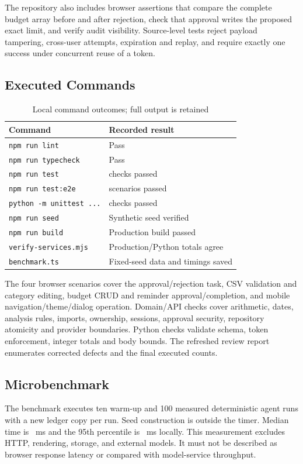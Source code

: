 \documentclass[conference,a4paper]{IEEEtran}
\begin{document}
The repository also includes browser assertions that compare the complete budget array before and after rejection, check that approval writes the proposed exact limit, and verify audit visibility. Source-level tests reject payload tampering, cross-user attempts, expiration and replay, and require exactly one success under concurrent reuse of a token.

\subsection{Executed Commands}
\begin{table}[t]
\caption{Local command outcomes; full output is retained}
\centering\small
\begin{tabular}{L{43mm}L{35mm}}
\toprule Command & Recorded result\\\midrule
\texttt{npm run lint} & Pass\\
\texttt{npm run typecheck} & Pass\\
\texttt{npm run test} & \UnitTests{} checks passed\\
\texttt{npm run test:e2e} & \BrowserTests{} scenarios passed\\
\texttt{python -m unittest ...} & \PythonTests{} checks passed\\
\texttt{npm run seed} & Synthetic seed verified\\
\texttt{npm run build} & Production build passed\\
\texttt{verify-services.mjs} & Production/Python totals agree\\
\texttt{benchmark.ts} & Fixed-seed data and timings saved\\
\bottomrule
\end{tabular}
\end{table}

The four browser scenarios cover the approval/rejection task, CSV validation and category editing, budget CRUD and reminder approval/completion, and mobile navigation/theme/dialog operation. Domain/API checks cover arithmetic, dates, analysis rules, imports, ownership, sessions, approval security, repository atomicity and provider boundaries. Python checks validate schema, token enforcement, integer totals and body bounds. The refreshed review report enumerates corrected defects and the final executed counts.

\subsection{Microbenchmark}
The benchmark executes ten warm-up and 100 measured deterministic agent runs with a new ledger copy per run. Seed construction is outside the timer. Median time is \AgentMedian{}~ms and the 95th percentile is \AgentPninetyfive{}~ms locally. This measurement excludes HTTP, rendering, storage, and external models. It must not be described as browser response latency or compared with model-service throughput.
\end{document}
